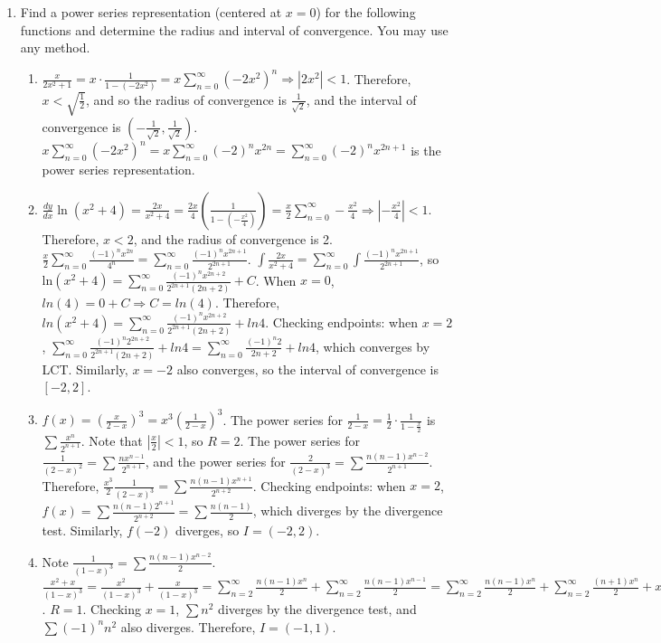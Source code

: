 \documentclass[12pt]{article}
\begin{document}
\begin{enumerate}
\begin{enumerate}
\end{enumerate}

\pagebreak

\item Find a power series representation (centered at $x=0$) for the following functions and determine the radius and interval of convergence.  You may use any method.
\begin{enumerate}
\item $\frac{x}{2x^2+1}= x \cdot \frac{1}{1-(-{2x^2})} = x\sum_{n=0}^\infty(-2x^2)^n\Rightarrow |2x^2| < 1$. Therefore, $x<\sqrt{\frac{1}{2}}$, and so the radius of convergence is $\frac{1}{\sqrt{2}}$, and the interval of convergence is $(-\frac{1}{\sqrt{2}}, \frac{1}{\sqrt{2}})$. $x\sum_{n=0}^\infty(-2x^2)^n = x\sum_{n=0}^\infty(-2)^nx^{2n} = \sum_{n=0}^\infty (-2)^nx^{2n+1}$ is the power series representation. 
\\
\item $\frac{dy}{dx}\ln(x^2+4) = \frac{2x}{x^2+4} = \frac{2x}{4}(\frac{1}{1-(-\frac{x^2}{4})}) = \frac{x}{2}\sum_{n=0}^\infty-\frac{x^2}{4}\Rightarrow |-\frac{x^2}{4}|<1$. Therefore, $x<2$, and the radius of convergence is 2. $\frac{x}{2}\sum_{n=0}^\infty\frac{(-1)^nx^{2n}}{4^n}=\sum_{n=0}^\infty\frac{(-1)^nx^{2n+1}}{2^{2n+1}}$. $\int\frac{2x}{x^2+4} = \sum_{n=0}^\infty\int\frac{(-1)^nx^{2n+1}}{2^{2n+1}}$, so $\text{ln}(x^2+4) = \sum_{n=0}^\infty\frac{(-1)^nx^{2n+2}}{2^{2n+1}(2n+2)} + C$. When $x=0$, $ln(4)=0+C\Rightarrow C = ln(4)$. Therefore, $ln(x^2+4) = \sum_{n=0}^\infty\frac{(-1)^nx^{2n+2}}{2^{2n+1}(2n+2)} + ln4$. Checking endpoints: when $x=2$, $\sum_{n=0}^\infty\frac{(-1)^n2^{2n+2}}{2^{2n+1}(2n+2)} + ln4 = \sum_{n=0}^\infty\frac{(-1)^n2}{2n+2} + ln4$, which converges by LCT. Similarly, $x=-2$ also converges, so the interval of convergence is $[-2,2]$. 
\\
\item $f(x)=\left(\frac{x}{2-x}\right)^3 = x^3\left(\frac{1}{2-x}\right)^3$. The power series for $\frac{1}{2-x}=\frac{1}{2}\cdot\frac{1}{1-\frac{x}{2}}$ is $\sum\frac{x^n}{2^{n+1}}$. Note that $|\frac{x}{2}|<1$, so $R=2$. The power series for $\frac{1}{(2-x)^2}=\sum\frac{nx^{n-1}}{2^{n+1}}$, and the power series for $\frac{2}{(2-x)^3} = \sum\frac{n(n-1)x^{n-2}}{2^{n+1}}$. Therefore, $\frac{x^3}{2}\frac{1}{(2-x)^3} = \sum\frac{n(n-1)x^{n+1}}{2^{n+2}}$. Checking endpoints: when $x=2$, $f(x) = \sum\frac{n(n-1)2^{n+1}}{2^{n+2}} = \sum\frac{n(n-1)}{2}$, which diverges by the divergence test. Similarly, $f(-2)$ diverges, so $I = (-2, 2)$. 
\\
\item Note $\frac{1}{(1-x)^3} = \sum\frac{n(n-1)x^{n-2}}{2}$. $\frac{x^2+x}{(1-x)^3} = \frac{x^2}{(1-x)^3} + \frac{x}{(1-x)^3} = \sum_{n=2}^\infty\frac{n(n-1)x^n}{2} + \sum_{n=2}^\infty\frac{n(n-1)x^{n-1}}{2}=\sum_{n=2}^\infty\frac{n(n-1)x^n}{2} + \sum_{n=2}^\infty\frac{(n+1)x^{n}}{2}+x  = \sum_{n=2}^\infty\frac{x^n(n(n-1)+n(n+1))}{2}+x = \sum_{n=1}^\infty x^nn^2$. $R=1$. Checking $x=1$, $\sum n^2$ diverges by the divergence test, and $\sum (-1)^n n^2$ also diverges. Therefore, $I = (-1, 1)$. 




\end{enumerate}
\end{enumerate}
\end{document}
